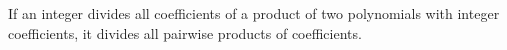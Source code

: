 If an integer divides all coefficients of a product of two polynomials with integer coefficients, it divides all pairwise products of coefficients.

